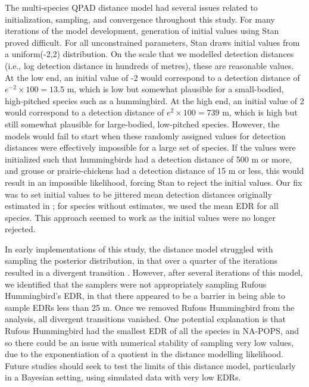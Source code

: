 \documentclass[12pt]{article}
\begin{document}
\par The multi-species QPAD distance model had several issues related to initialization, sampling, and convergence throughout this study.
For many iterations of the model development, generation of initial values using Stan proved difficult.
For all unconstrained parameters, Stan draws initial values from a uniform(-2,2) distribution.
On the scale that we modelled detection distances (i.e., log detection distance in hundreds of metres), these are reasonable values.
At the low end, an initial value of -2 would correspond to a detection distance of $e^{-2} \times 100 = 13.5$ m, which is low but somewhat plausible for a small-bodied, high-pitched species such as a hummingbird.
At the high end, an initial value of 2 would correspond to a detection distance of $e^{2} \times 100 = 739$ m, which is high but still somewhat plausible for large-bodied, low-pitched species.
However, the models would fail to start when these randomly assigned values for detection distances were effectively impossible for a large set of species.
If the values were initialized such that hummingbirds had a detection distance of 500 m or more, and grouse or prairie-chickens had a detection distance of 15 m or less, this would result in an impossible likelihood, forcing Stan to reject the initial values.
Our fix was to set initial values to be jittered mean detection distances originally estimated in \citet{edwards_point_2023}; for species without estimates, we used the mean EDR for all species.
This approach seemed to work as the initial values were no longer rejected.

\par In early implementations of this study, the distance model struggled with sampling the posterior distribution, in that over a quarter of the iterations resulted in a divergent transition \citep{betancourt_diagnosing_2016, leimkuhler_simulating_2005}.
However, after several iterations of this model, we identified that the samplers were not appropriately sampling Rufous Hummingbird's EDR, in that there appeared to be a barrier in being able to sample EDRs less than 25 m. 
Once we removed Rufous Hummingbird from the analysis, all divergent transitions vanished.
One potential explanation is that Rufous Hummingbird had the smallest EDR of all the species in NA-POPS, and so there could be an issue with numerical stability of sampling very low values, due to the exponentiation of a quotient in the distance modelling likelihood.
Future studies should seek to test the limits of this distance model, particularly in a Bayesian setting, using simulated data with very low EDRs.
\end{document}
